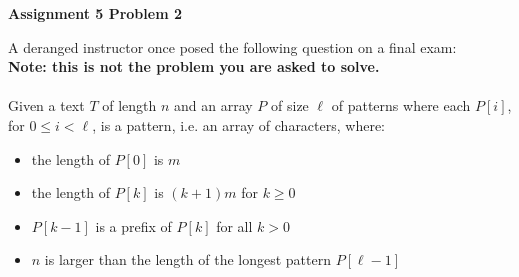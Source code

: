 \documentclass[12pt]{article}
\begin{document}
	
	\begin{center}
		{\Large\bf Assignment 5 Problem 2}\\
		\vspace{3mm}
	\end{center}
	
	\def\question#1{\item[\bf #1.]}
	\def\part#1{\item[\bf #1)]}
	\newcommand{\pc}[1]{\mbox{\textbf{#1}}} %
	
	
	
	
	
	A deranged instructor once posed the following question on a final exam: \\
	\textbf{Note: this is not the problem you are asked to solve.} \\
	~\\
	Given a text $T$ of length $n$ and an array $P$ of size $\ell$ of patterns where each $P[i]$, for $0 \leq i < \ell$, is a pattern, i.e. an array of characters, where:
	\begin{itemize}
		\item the length of $P[0]$ is $m$
		\item the length of $P[k]$ is $(k+1)m$ for $k \geq 0$ 
		\item $P[k-1]$ is a prefix of $P[k]$ for all $k > 0$
		\item $n$ is larger than the length of the longest pattern $P[\ell-1]$
	\end{itemize}
	
\end{document}
